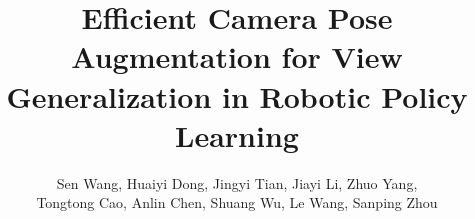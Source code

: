 \documentclass[runningheads]{llncs}
\begin{document}
\title{
Efficient Camera Pose Augmentation for View Generalization in Robotic Policy Learning
}


\author{Sen Wang, 
Huaiyi Dong, 
Jingyi Tian, 
Jiayi Li, 
Zhuo Yang, \\
Tongtong Cao, 
Anlin Chen, 
Shuang Wu, 
Le Wang, 
Sanping Zhou}


\maketitle
{\let\thefootnote\relax{}}
\vspace{-3ex}













%
%

% 



% 
\end{document}
